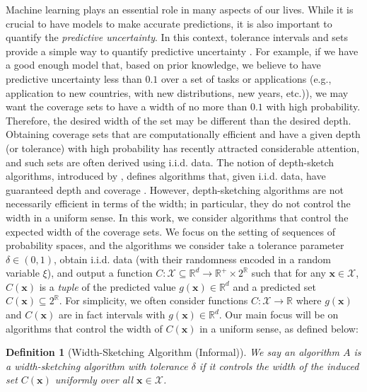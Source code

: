\documentclass{article} %
\newtheorem{definition}{Definition}[section]
\theoremstyle{remark}
\theoremstyle{definition}      %
\begin{document}
Machine learning plays an essential role in many aspects of our lives. While it is crucial to have models to make accurate predictions, it is also important to quantify the \emph{predictive uncertainty}. In this context, tolerance intervals and sets provide a simple way to quantify predictive uncertainty \citep[see, e.g.,][for an introduction]{guttman1970statistical}. For example, if we have a good enough model that, based on prior knowledge, we believe to have predictive uncertainty less than $0.1$ over a set of tasks or applications (e.g., application to new countries, with new distributions,  new years, etc.)), we may want the coverage sets to have a width of no more than $0.1$ with high probability. Therefore, the desired width of the set may be different than the desired depth. Obtaining coverage sets that are computationally efficient and have a given depth (or tolerance) with high probability has recently attracted considerable attention, and such sets are often derived using i.i.d. data. The notion of depth-sketch algorithms, introduced by \cite{barber2021limits}, defines algorithms that, given i.i.d. data, have guaranteed depth and coverage \citep[see, e.g.,][]{bates2021distributionfree,angelopoulos2024conformal}. However, depth-sketching algorithms are not necessarily efficient in terms of the width; in particular, they do not control the width in a uniform sense. In this work, we consider algorithms that control the expected width of the coverage sets. We focus on the setting of sequences of probability spaces, and the algorithms we consider take a tolerance parameter $\delta \in (0,1)$, obtain i.i.d. data (with their randomness encoded in a random variable $\xi$), and output a function $C: \mathcal{X} \subseteq \mathbb{R}^d \rightarrow \mathbb{R}^+ \times 2^{\mathbb{R}}$ such that for any $\bm{x} \in \mathcal{X}$, $C(\bm{x})$ is a \emph{tuple} of the predicted value $g(\bm{x}) \in \mathbb{R}^d$ and a predicted set $C(\bm{x}) \subseteq 2^{\mathbb{R}}$. For simplicity, we often consider functions $C: \mathcal{X} \rightarrow \mathbb{R}$ where $g(\bm{x})$ and $C(\bm{x})$ are in fact intervals with $g(\bm{x}) \in \mathbb{R}^d$. Our main focus will be on algorithms that control the width of $C(\bm{x})$ in a uniform sense, as defined below:
\begin{definition}[Width-Sketching Algorithm (Informal)]
    We say an algorithm $A$ is a width-sketching algorithm with tolerance $\delta$ if it controls the width of the induced set $C(\bm{x})$ uniformly over all $\bm x \in \mathcal{X}$.
\end{definition}
\end{document}
